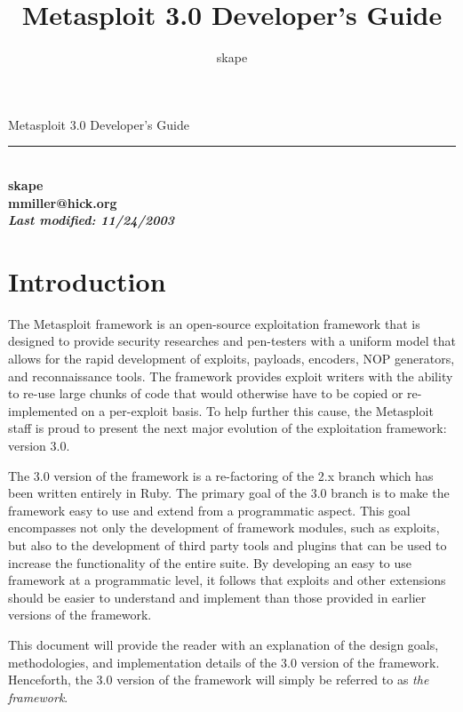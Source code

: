 \documentclass{report}
\begin{document}
\title{Metasploit 3.0 Developer's Guide}
\author{skape}

\begin{titlepage}
    \begin{center}
        \huge{{Metasploit 3.0 Developer's Guide}} \\[150mm]
        \rule{10cm}{1pt} \\[8mm]
        \small\bf{skape} \\
        \small\bf{mmiller@hick.org} \\[4mm]
        \textit{Last modified: \small{11/24/2003}}
    \end{center}
\end{titlepage}

\tableofcontents

\setlength{\parindent}{0pt} \setlength{\parskip}{8pt}

\chapter{Introduction}

\par
The Metasploit framework is an open-source exploitation framework
that is designed to provide security researches and pen-testers with
a uniform model that allows for the rapid development of exploits,
payloads, encoders, NOP generators, and reconnaissance tools.  The
framework provides exploit writers with the ability to re-use large
chunks of code that would otherwise have to be copied or
re-implemented on a per-exploit basis.  To help further this cause,
the Metasploit staff is proud to present the next major evolution of
the exploitation framework: version 3.0.

\par
The 3.0 version of the framework is a re-factoring of the 2.x branch
which has been written entirely in Ruby.  The primary goal of the
3.0 branch is to make the framework easy to use and extend from a
programmatic aspect.  This goal encompasses not only the development
of framework modules, such as exploits, but also to the development
of third party tools and plugins that can be used to increase the
functionality of the entire suite.  By developing an easy to use
framework at a programmatic level, it follows that exploits and
other extensions should be easier to understand and implement than
those provided in earlier versions of the framework.

\par
This document will provide the reader with an explanation of the
design goals, methodologies, and implementation details of the 3.0
version of the framework.  Henceforth, the 3.0 version of the
framework will simply be referred to as \textit{the framework}.
\end{document}

